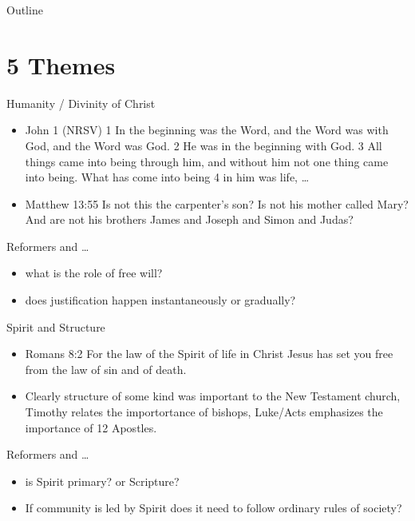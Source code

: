 

\maketitle
\begin{frame}{Outline}
\setcounter{tocdepth}{1}
\tableofcontents
\end{frame}

\section{5 Themes}
\label{sec-1}
\begin{frame}[label=sec-1-1]{Humanity / Divinity of Christ}
\begin{itemize}
\item John 1  (NRSV) 1 In the beginning was the Word, and the Word was with God, and the Word was God. 2 He was in the beginning with God. 3 All things came into being through him, and without him not one thing came into being. What has come into being 4 in him was life, \ldots{}
\item Matthew 13:55 Is not this the carpenter’s son? Is not his mother called Mary? And are not his brothers James and Joseph and Simon and Judas?
\end{itemize}
\end{frame}

\begin{frame}[label=sec-1-2]{Reformers and \ldots{}}
\begin{itemize}
\item what is the role of free will?
\item does justification happen instantaneously or gradually?
\end{itemize}
\end{frame}
\begin{frame}[label=sec-1-3]{Spirit and Structure}
\begin{itemize}
\item Romans 8:2 For the law of the Spirit of life in Christ Jesus has set you free from the law of sin and of death.
\item Clearly structure of some kind was important to the New Testament church, Timothy relates the importortance of bishops, Luke/Acts emphasizes the importance of 12 Apostles.
\end{itemize}
\end{frame}

\begin{frame}[label=sec-1-4]{Reformers and \ldots{}}
\begin{itemize}
\item is Spirit primary? or Scripture?
\item If community is led by Spirit does it need to follow ordinary rules of society?
\end{itemize}
\end{frame}


